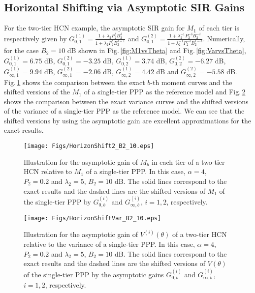 \documentclass[12pt,draftclsnofoot,journal,onecolumn]{IEEEtran}
\def\figref#1{Fig.\,\ref{#1}}%
\newlength{\figwidth}
\begin{document}
\subsection{Horizontal Shifting via Asymptotic SIR Gains} 
For the two-tier HCN example, the asymptotic SIR gain for $M_1$ of each tier is respectively given by $G_{0,1}^{(1)} = \frac{1+\lambda_2 P_2^\delta B_2^\delta}{1+\lambda_2 P_2^\delta B_2^{\delta-1}}$ and $G_{0,1}^{(2)} = \frac{1+\lambda_2^{-1} P_2^{-\delta} B_2^{-\delta}}{1+\lambda_2^{-1} P_2^{-\delta} B_2^{1-\delta}}$.
Numerically, for the case $B_2=10$ dB shown in \figref{fig:M1vsTheta} and \figref{fig:VarvsTheta}, $G_{0,1}^{(1)} = 6.75$ dB, $G_{0,1}^{(2)} = -3.25$ dB, $G_{0,2}^{(1)} = 3.74$ dB,  $G_{0,2}^{(2)} = -6.27$ dB, $G_{\infty,1}^{(1)} = 9.94$ dB, $G_{\infty,1}^{(2)} = -2.06$ dB, $G_{\infty,2}^{(1)} = 4.42$ dB and $G_{\infty,2}^{(2)} = -5.58$ dB. \figref{fig:HorizonShift2_B2_10} shows the comparison between the exact $b$-th moment curves and the shifted versions of the $M_1$ of a single-tier PPP as the reference model and \figref{fig:HorizonShiftVar_B2_10} shows the comparison between the exact variance curves and the shifted versions of the variance of a single-tier PPP as the reference model. We can see that the shifted versions by using the asymptotic gain are excellent approximations for the exact results. 
\begin{figure} [!t]
	\begin{center}
		\texttt{[image: Figs/HorizonShift2\_B2\_10.eps]}
		\caption{Illustration for the asymptotic gain of $M_b$ in each tier of a two-tier HCN relative to $M_1$ of a single-tier PPP. In this case, $\alpha=4$, $P_2=0.2$ and $\lambda_2=5$, $B_2=10$ dB. The solid lines correspond to the exact results and the dashed lines are the shifted versions of $M_1$ of the single-tier PPP by $G_{0,b}^{(i)}$ and $G_{\infty,b}^{(i)}$, $i=1,2$, respectively.}
		\label{fig:HorizonShift2_B2_10}
	\end{center}
\end{figure}
\begin{figure} [!t]
	\begin{center}
		\texttt{[image: Figs/HorizonShiftVar\_B2\_10.eps]}
		\caption{Illustration for the asymptotic gain of $V^{(i)}(\theta)$ of a two-tier HCN relative to the variance of a single-tier PPP. In this case, $\alpha=4$, $P_2=0.2$ and $\lambda_2=5$, $B_2=10$ dB. The solid lines correspond to the exact results and the dashed lines are the shifted versions of $V(\theta)$ of the single-tier PPP by the asymptotic gains $G_{0,b}^{(i)}$ and $G_{\infty,b}^{(i)}$, $i=1,2$, respectively.}
		\label{fig:HorizonShiftVar_B2_10}
	\end{center}
\end{figure}
\end{document}
